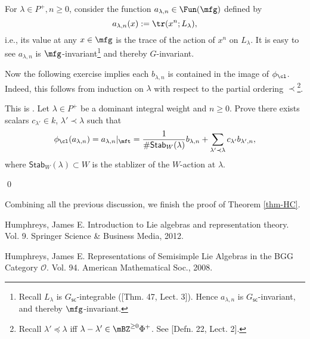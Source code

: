 		For $\lambda \in P^+, n\ge 0$, consider the function $a_{\lambda,n}\in \Fun(\mfg) $ defined by
		\[
			a_{\lambda,n}(x):=\tr(x^n; L_\lambda),
		\]
		i.e., its value at any $x\in \mfg$ is the trace of the action of $x^n$ on $L_\lambda$. It is easy to see $a_{\lambda,n}$ is $\mfg$-invariant\footnote{Recall $L_\lambda$ is $G_\mathsf{sc}$-integrable ([Thm. 47, Lect. 3]). Hence $a_{\lambda,n}$ is $G_\mathsf{sc}$-invariant, and thereby $\mfg$-invariant.
		} and thereby $G$-invariant. 

		Now the following exercise implies each $b_{\lambda,n}$ is contained in the image of $\phi_\cl$. Indeed, this follows from induction on $\lambda$ with respect to the partial ordering $\prec$\footnote{Recall $\lambda'\preceq\lambda$ iff $\lambda-\lambda' \in \mBZ^{\ge 0}\Phi^+$. See [Defn. 22, Lect. 2].}.

		\begin{exe}
			This is . Let $\lambda \in P^+$ be a dominant integral weight and $n\ge 0$. Prove there exists scalars $c_{\lambda'} \in k$, $\lambda' \prec \lambda$ such that
			\[
				\phi_\cl(a_{\lambda,n}) = a_{\lambda,n}|_{\mft} = \frac{1}{\#\mathsf{Stab}_W(\lambda)}b_{\lambda,n} + \sum_{\lambda' \prec \lambda} c_{\lambda'}b_{\lambda',n},
			\]
			where $\mathsf{Stab}_W(\lambda)\subset W$ is the stablizer of the $W$-action at $\lambda$.

		\end{exe}

	\qed

	Combining all the previous discussion, we finish the proof of Theorem \ref{thm-HC}.

	
	
\begin{thebibliography}{Yau}

	 Humphreys, James E. Introduction to Lie algebras and representation theory. Vol. 9. Springer Science \& Business Media, 2012.

	 Humphreys, James E. Representations of Semisimple Lie Algebras in the BGG Category $\mathcal{O} $. Vol. 94. American Mathematical Soc., 2008.

\end{thebibliography}

 


